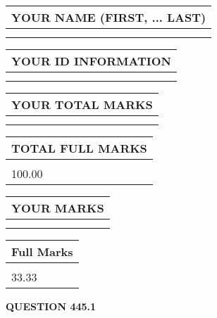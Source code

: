 \documentclass{ctexart}
\begin{document}
   
   
   
\newpage 
\setcounter{page}{ 
   445001 } 
   
   
   
   
\noindent\begin{tabular}{|l|}
\hline
YOUR NAME (FIRST, ... LAST)  \\
\hline
 \\ 
 \\ 
\hline
\end{tabular}
\hspace{0.05in} \begin{tabular}{|l|}
\hline
 YOUR   ID   INFORMATION  \\
\hline
 \\ 
 \\ 
\hline
\end{tabular}
   
   
\vspace{0.2in}\noindent\begin{tabular}{|l|}
\hline
YOUR TOTAL MARKS  \\
\hline
 \\ 
 \\ 
\hline
\end{tabular}
\hspace{0.05in} \begin{tabular}{|l|}
\hline
TOTAL FULL MARKS  \\
\hline
 \\ 
100.00 \\
\hline
\end{tabular}
   
   
 \vspace{0.2in}
 
 
 
 
   
   
  
\vspace{0.2in}
  
\noindent\begin{tabular}{|l|}
\hline
 YOUR MARKS  \\
\hline
 \\ 
 \\ 
\hline
\end{tabular}
\hspace{0.05in} \begin{tabular}{|l|}
\hline
 Full Marks  \\
\hline
 \\ 
33.33 \\
\hline
\end{tabular}
{\textbf{\Large{QUESTION
445.1 
}}}
  
\end{document}
